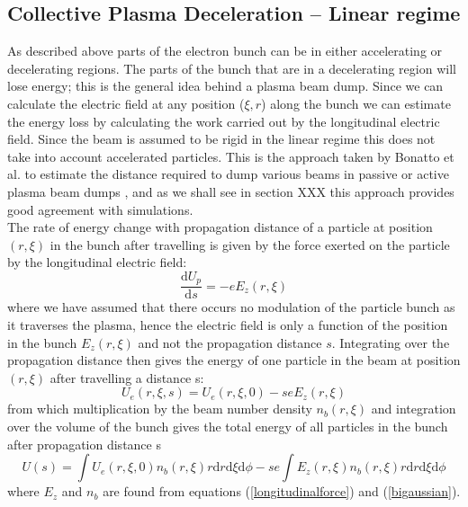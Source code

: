 \subsection{Collective Plasma Deceleration -- Linear regime }
As described above parts of the electron bunch can be in either accelerating or decelerating regions. The parts of the bunch that are in a decelerating region will lose energy; this is the general idea behind a plasma beam dump. Since we can calculate the electric field at any position ($\xi,r$) along the bunch we can estimate the energy loss by calculating the work carried out by the longitudinal electric field. Since the beam is assumed to be rigid in the linear regime this does not take into account accelerated particles. This is the approach taken by Bonatto et al. to estimate the distance required to dump various beams in passive or active plasma beam dumps \citep{Bonatto2016}, and as we shall see in section XXX this approach provides good agreement with simulations.\\
The rate of energy change with propagation distance of a particle at position $(r,\xi)$ in the bunch after travelling is given by the force exerted on the particle by the longitudinal electric field:
\begin{equation}
\frac{\mathrm{d}U_p}{\mathrm{d}s}=-eE_z(r,\xi)
\end{equation}
where we have assumed that there occurs no modulation of the particle bunch as it traverses the plasma, hence the electric field is only a function of the position in the bunch $E_z(r,\xi)$ and not the propagation distance $s$. Integrating over the propagation distance then gives the energy of one particle in the beam at position $(r,\xi)$ after travelling a distance s:
\begin{equation}
U_e(r,\xi,s)=U_e(r,\xi,0)-seE_z(r,\xi)
\end{equation}
from which multiplication by the beam number density $n_b(r,\xi)$ and integration over the volume of the bunch gives the total energy of all particles in the bunch after propagation distance s
\begin{equation}
U(s)=\int  U_e(r,\xi,0)n_b(r,\xi)r\mathrm{d}r\mathrm{d}\xi\mathrm{d}\phi-se\int E_z(r,\xi)n_b(r,\xi)r\mathrm{d}r\mathrm{d}\xi\mathrm{d}\phi
\end{equation}
where $E_z$ and $n_b$ are found from equations (\ref{longitudinalforce}) and (\ref{bigaussian}).
